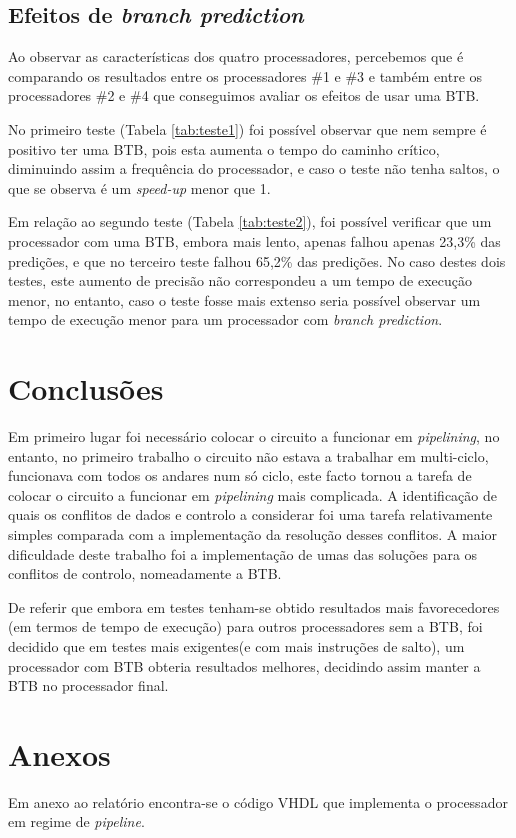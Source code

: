 \documentclass[11pt]{article}
\numberwithin{equation}{section}
\begin{document}
\subsection{Efeitos de \textit{branch prediction}}

Ao observar as características dos quatro processadores, percebemos que é comparando os resultados entre os processadores \#1 e \#3 e também entre os processadores \#2 e \#4 que conseguimos avaliar os efeitos de usar uma BTB.

No primeiro teste (Tabela \ref{tab:teste1}) foi possível observar que nem sempre é positivo ter uma BTB, pois esta aumenta o tempo do caminho crítico, diminuindo assim a frequência do processador, e caso o teste não tenha saltos, o que se observa é um \textit{speed-up} menor que 1.

Em relação ao segundo teste (Tabela \ref{tab:teste2}), foi possível verificar que um processador com uma BTB, embora mais lento, apenas falhou apenas 23,3\% das predições, e que no terceiro teste falhou 65,2\% das predições. No caso destes dois testes, este aumento de precisão não correspondeu a um tempo de execução menor, no entanto, caso o teste fosse mais extenso seria possível observar um tempo de execução menor para um processador com \textit{branch prediction}.
\section{Conclusões}

Em primeiro lugar foi necessário colocar o circuito a funcionar em \textit{pipelining}, no entanto, no primeiro trabalho o circuito não estava a trabalhar em multi-ciclo, funcionava com todos os andares num só ciclo, este facto tornou a tarefa de colocar o circuito a funcionar em \textit{pipelining} mais complicada.
A identificação de quais os conflitos de dados e controlo a considerar foi uma tarefa relativamente simples comparada com a implementação da resolução desses conflitos. A maior dificuldade deste trabalho foi a implementação de umas das soluções para os conflitos de controlo, nomeadamente a BTB.

De referir que embora em testes tenham-se obtido resultados mais favorecedores (em termos de tempo de execução) para outros processadores sem a BTB, foi decidido que em testes mais exigentes(e com mais instruções de salto), um processador com BTB obteria resultados melhores, decidindo assim manter a BTB no processador final.

\pagebreak

\section{Anexos}

Em anexo ao relatório encontra-se o código VHDL que implementa o processador em regime de \textit{pipeline}.

\pagebreak

\listoftodos
\end{document}
